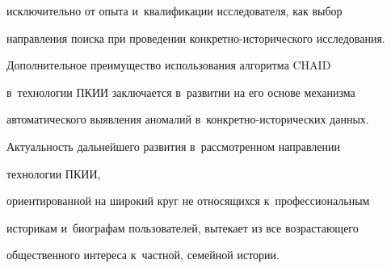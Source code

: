 исключительно от опыта и~квалификации исследователя, как выбор 


направления поиска при проведении конкретно-исторического исследования.


  


  Дополнительное преимущество использования алгоритма CHAID 


  в~технологии ПКИИ заключается в~развитии на его основе механизма 


автоматического выявления аномалий в~кон\-крет\-но-ис\-то\-ри\-че\-ских данных.


  


  Актуальность дальнейшего развития в~рассмотренном направлении 


технологии ПКИИ, 


ориентированной на широкий круг не относящихся к~профессиональным 


историкам и~биографам пользователей, вытекает из все возрастающего 


общественного интереса к~частной, семейной истории.


  


